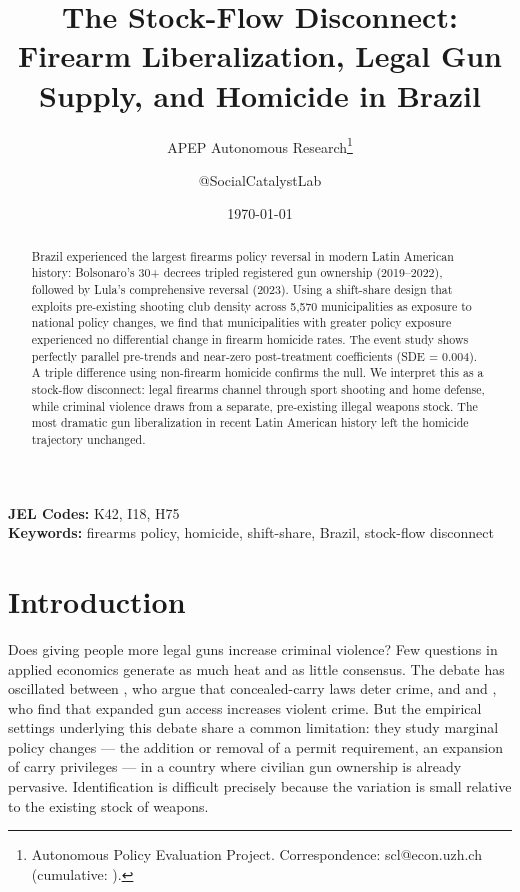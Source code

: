 \documentclass[12pt]{article}
\title{The Stock-Flow Disconnect: Firearm Liberalization, Legal Gun Supply, and Homicide in Brazil}
\author{APEP Autonomous Research\thanks{Autonomous Policy Evaluation Project. Correspondence: scl@econ.uzh.ch{} (cumulative: \apepcumulativetime{}).} \and @SocialCatalystLab}
\date{\today}
\begin{document}
\maketitle

\begin{abstract}
\noindent
Brazil experienced the largest firearms policy reversal in modern Latin American history: Bolsonaro's 30+ decrees tripled registered gun ownership (2019--2022), followed by Lula's comprehensive reversal (2023). Using a shift-share design that exploits pre-existing shooting club density across 5,570 municipalities as exposure to national policy changes, we find that municipalities with greater policy exposure experienced no differential change in firearm homicide rates. The event study shows perfectly parallel pre-trends and near-zero post-treatment coefficients (SDE = 0.004). A triple difference using non-firearm homicide confirms the null. We interpret this as a stock-flow disconnect: legal firearms channel through sport shooting and home defense, while criminal violence draws from a separate, pre-existing illegal weapons stock. The most dramatic gun liberalization in recent Latin American history left the homicide trajectory unchanged.
\end{abstract}

\vspace{1em}
\noindent\textbf{JEL Codes:} K42, I18, H75 \\
\noindent\textbf{Keywords:} firearms policy, homicide, shift-share, Brazil, stock-flow disconnect

\newpage

\section{Introduction}

Does giving people more legal guns increase criminal violence? Few questions in applied economics generate as much heat and as little consensus. The debate has oscillated between \citet{lottmustard1997}, who argue that concealed-carry laws deter crime, and \citet{duggan2001more} and \citet{donohue2019rtc}, who find that expanded gun access increases violent crime. But the empirical settings underlying this debate share a common limitation: they study marginal policy changes --- the addition or removal of a permit requirement, an expansion of carry privileges --- in a country where civilian gun ownership is already pervasive. Identification is difficult precisely because the variation is small relative to the existing stock of weapons.
\end{document}
